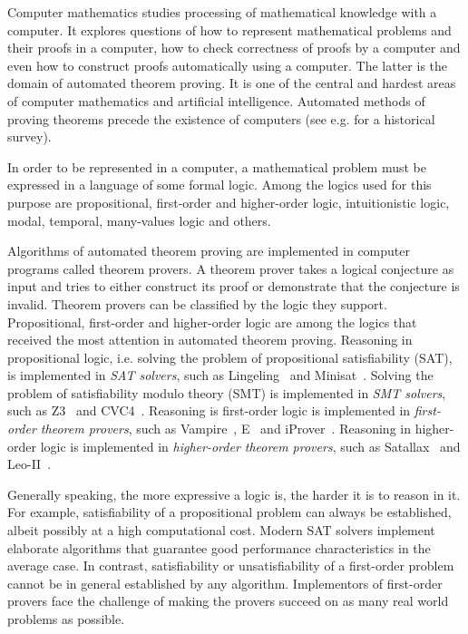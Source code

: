 
Computer mathematics studies processing of mathematical knowledge with a computer. It explores questions of how to represent mathematical problems and their proofs in a computer, how to check correctness of proofs by a computer and even how to construct proofs automatically using a computer. The latter is the domain of automated theorem proving. It is one of the central and hardest areas of computer mathematics and artificial intelligence. Automated methods of proving theorems precede the existence of computers (see e.g. \cite{bundy1999survey,davis2001early,harrison2007short} for a historical survey).

In order to be represented in a computer, a mathematical problem must be expressed in a language of some formal logic. Among the logics used for this purpose are propositional, first-order and higher-order logic, intuitionistic logic, modal, temporal, many-values logic and others.

Algorithms of automated theorem proving are implemented in computer programs called theorem provers. A theorem prover takes a logical conjecture as input and tries to either construct its proof or demonstrate that the conjecture is invalid. Theorem provers can be classified by the logic they support. Propositional, first-order and higher-order logic are among the logics that received the most attention in automated theorem proving. Reasoning in propositional logic, i.e. solving the problem of propositional satisfiability (SAT), is implemented in \emph{SAT solvers}, such as Lingeling~\cite{Lingeling} and Minisat~\cite{Minisat}. Solving the problem of satisfiability modulo theory (SMT) is implemented in \emph{SMT solvers}, such as Z3~\cite{Z3} and CVC4~\cite{CVC4}. Reasoning is first-order logic is implemented in \emph{first-order theorem provers}, such as Vampire~\cite{Vampire13}, E~\cite{E13} and iProver~\cite{iProver}. Reasoning in higher-order logic is implemented in \emph{higher-order theorem provers}, such as Satallax~\cite{Satallax} and Leo-II~\cite{LeoII}.

Generally speaking, the more expressive a logic is, the harder it is to reason in it. For example, satisfiability of a propositional problem can always be established, albeit possibly at a high computational cost. Modern SAT solvers implement elaborate algorithms that guarantee good performance characteristics in the average case. In contrast, satisfiability or unsatisfiability of a first-order problem cannot be in general established by any algorithm. Implementors of first-order provers face the challenge of making the provers succeed on as many real world problems as possible.

